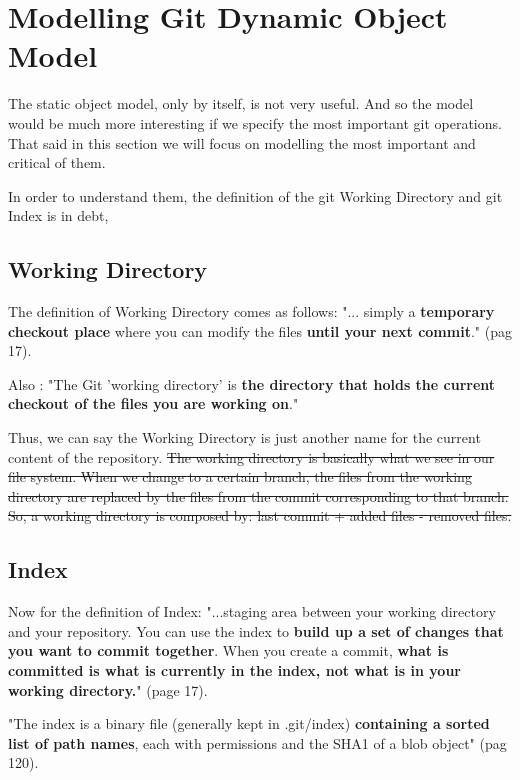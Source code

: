 \section {Modelling Git Dynamic Object Model}
The static object model, only by itself, 
is not very useful. And so
the model would be much more interesting if we specify 
the most important git operations. That said in this
section we will focus on modelling the most important
and critical of them. \par

In order to understand them, the definition
of the git Working Directory and git Index is in debt,


\subsection{Working Directory}
The definition of Working Directory comes as follows:
"... simply a {\bf temporary checkout place} where you can 
modify the files {\bf until your next commit}."
\cite{gitComm} (pag 17). \par
Also : "The Git 'working directory' is {\bf the directory that holds 
the current \gls{checkout} of the files you are working on}."\par
Thus, we can say the Working Directory is just another
name for the current content of the repository.
\sout{The working directory is basically what we see in our file
system. When we change to a certain branch, the files from the 
working directory are replaced by the files from the commit 
corresponding to that branch. So, a working directory is 
composed by: last commit + added files - removed files.\\}

\subsection{Index}
Now for the definition of Index:
"...staging area between your working directory and your
repository. You can use the index to {\bf build up a set of 
changes that you want to commit together}. When you create
a commit, {\bf what is committed is what is currently in the
index, not what is in your working directory.}"
\cite{gitComm} (page 17). \par

"The index is a binary file (generally kept in .git/index) 
{\bf containing a sorted list of path names}, each with permissions and the
SHA1 of a blob object" \cite{gitComm} (pag 120). 

